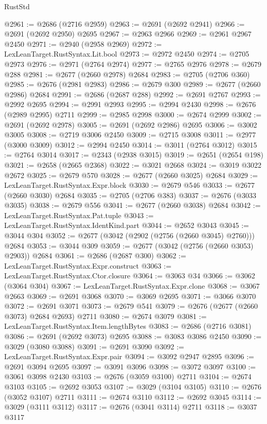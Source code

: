 \begin{lexlean}{RustStd}
\begin{coremodule}
@2961 := @2686 (@2716 @2959)
@2963 := @2691 (@2692 @2941)
@2966 := @2691 (@2692 @2950) @2695
@2967 := @2963 @2966
@2969 := @2961 @2967 @2450
@2971 := @2940 (@2958 @2969)
@2972 := LexLeanTarget.RustSyntax.Lit.bool
@2973 := @2972 @2450
@2974 := @2705 @2973
@2976 := @2971 (@2764 @2974)
@2977 := @2765 @2976
@2978 := @2679 @288
@2981 := @2677 (@2660 @2978) @2684
@2983 := @2705 (@2706 @360)
@2985 := @2676 (@2981 @2983)
@2986 := @2679 @300
@2989 := @2677 (@2660 @2986) @2684
@2991 := @2686 (@2687 @288)
@2992 := @2691 @2767
@2993 := @2992 @2695
@2994 := @2991 @2993
@2995 := @2994 @2430
@2998 := @2676 (@2989 @2995) @2711
@2999 := @2985 @2998
@3000 := @2674 @2999
@3002 := @2691 (@2692 @2978)
@3005 := @2691 (@2692 @2986) @2695
@3006 := @3002 @3005
@3008 := @2719 @3006 @2450
@3009 := @2715 @3008
@3011 := @2977 (@3000 @3009)
@3012 := @2994 @2450
@3014 := @3011 (@2764 @3012)
@3015 := @2764 @3014
@3017 := @2343 (@2938 @3015)
@3019 := @2651 (@2654 @198)
@3021 := @2658 (@2665 @2368)
@3022 := @3021 @2668
@3024 := @3019 @3022 @2672
@3025 := @2679 @570
@3028 := @2677 (@2660 @3025) @2684
@3029 := LexLeanTarget.RustSyntax.Expr.block
@3030 := @2679 @546
@3033 := @2677 (@2660 @3030) @2684
@3035 := @2705 (@2706 @383)
@3037 := @2676 (@3033 @3035)
@3038 := @2679 @556
@3041 := @2677 (@2660 @3038) @2684
@3042 := LexLeanTarget.RustSyntax.Pat.tuple
@3043 := LexLeanTarget.RustSyntax.IdentKind.part
@3044 := @2652 @3043
@3045 := @3044 @304
@3052 := @2677 (@3042 (@2902 (@2756 (@2660 @3045) @2760))) @2684
@3053 := @3044 @309
@3059 := @2677 (@3042 (@2756 (@2660 @3053) @2903)) @2684
@3061 := @2686 (@2687 @300)
@3062 := LexLeanTarget.RustSyntax.Expr.construct
@3063 := LexLeanTarget.RustSyntax.Ctor.closure
@3064 := @3063 @34
@3066 := @3062 (@3064 @304)
@3067 := LexLeanTarget.RustSyntax.Expr.clone
@3068 := @3067 @2663
@3069 := @2691 @3068
@3070 := @3069 @2695
@3071 := @3066 @3070
@3072 := @2691 @3071
@3073 := @2679 @541
@3079 := @2676 (@2677 (@2660 @3073) @2684 @2693) @2711
@3080 := @2674 @3079
@3081 := LexLeanTarget.RustSyntax.Item.lengthBytes
@3083 := @2686 (@2716 @3081)
@3086 := @2691 (@2692 @3073) @2695
@3088 := @3083 @3086 @2450
@3090 := @3029 (@3080 @3088)
@3091 := @2691 @3090
@3092 := LexLeanTarget.RustSyntax.Expr.pair
@3094 := @3092 @2947 @2895
@3096 := @2691 @3094 @2695
@3097 := @3091 @3096
@3098 := @3072 @3097
@3100 := @3061 @3098 @2430
@3103 := @2676 (@3059 @3100) @2711
@3104 := @2674 @3103
@3105 := @2692 @3053
@3107 := @3029 (@3104 @3105)
@3110 := @2676 (@3052 @3107) @2711
@3111 := @2674 @3110
@3112 := @2692 @3045
@3114 := @3029 (@3111 @3112)
@3117 := @2676 (@3041 @3114) @2711
@3118 := @3037 @3117

\end{coremodule}
\end{lexlean}
